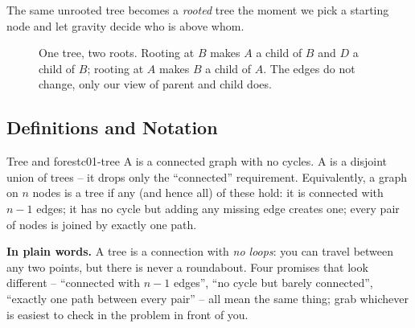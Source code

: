 The same unrooted tree becomes a \emph{rooted} tree the moment we pick a starting node
and let gravity decide who is above whom.

\begin{figure}[H]
\centering
{}
\caption{One tree, two roots. Rooting at $B$ makes $A$ a child of $B$ and $D$ a child
of $B$; rooting at $A$ makes $B$ a child of $A$. The edges do not change, only our
view of parent and child does.}\label{fig:c01-rooting}
\end{figure}

\subsection{Definitions and Notation}

\begin{definition}{Tree and forest}{c01-tree}
A  is a connected graph with no cycles. A  is a disjoint union
of trees -- it drops only the ``connected'' requirement. Equivalently, a graph on $n$
nodes is a tree if any (and hence all) of these hold: it is connected with $n-1$
edges; it has no cycle but adding any missing edge creates one; every pair of nodes is
joined by exactly one path.
\end{definition}

\noindent\textbf{In plain words.} A tree is a connection with \emph{no loops}: you can
travel between any two points, but there is never a roundabout. Four promises that look
different -- ``connected with $n-1$ edges'', ``no cycle but barely connected'', ``exactly
one path between every pair'' -- all mean the same thing; grab whichever is easiest to
check in the problem in front of you.

